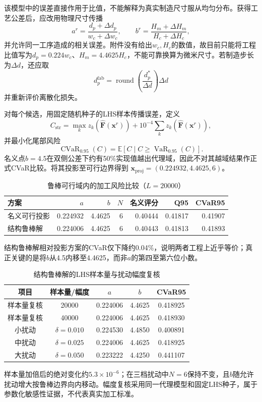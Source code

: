 \documentclass[UTF8,12pt,a4paper]{ctexart}
\newcommand{\CVaR}{\operatorname{CVaR}}
\begin{document}
该模型中的误差直接作用于比值，不能解释为真实制造尺寸服从均匀分布。获得工艺公差后，应改用物理尺寸传播
\begin{equation}
a^r=\frac{d_p+\Delta d_p}{w_c+\Delta w_c},\qquad
b^r=\frac{H_m+\Delta H_m}{H_c+\Delta H_c},
\end{equation}
并允许同一工序造成的相关误差。附件没有给出$w_c,H_c$的数值，故目前只能将工程比值写为$d_p=0.224w_c$、$H_m=4.4625H_c$，不能可靠换算为微米尺寸。若制造步长为$\Delta d$，还应取
\begin{equation}
d_p^{\mathrm{fab}}=\operatorname{round}\!\left(\frac{d_p^*}{\Delta d}\right)\Delta d
\end{equation}
并重新评价离散化损失。

对每个候选，用固定随机种子的LHS样本传播误差，定义
\begin{equation}
C_{\mathrm{str}}=\max_kz_k\!\left(\widehat{\bm F}(\bm x^r)\right)
+10^{-4}\sum_kz_k\!\left(\widehat{\bm F}(\bm x^r)\right),
\end{equation}
并最小化尾部风险
\begin{equation}
\CVaR_{0.95}(C)=\mathbb E[C\mid C\ge\operatorname{VaR}_{0.95}(C)].
\end{equation}
名义点$b=4.5$在双侧公差下约有50\%实现值越出代理域，因此不对其越域结果作正式CVaR比较。将其投影至可行边界得到
$\bm x_{\mathrm{proj}}=(0.224932,4.4625,6)$。

\begin{table}[H]\centering\small
\caption{鲁棒可行域内的加工风险比较（$L=20000$）}
\begin{tabular}{lrrrrrr}
\toprule
方案&$a$&$b$&$N$&名义评分&Q95&CVaR95\\\midrule
名义可行投影&0.224932&4.4625&6&0.40444&0.41817&0.41907\\
结构鲁棒解&0.224006&4.4625&6&0.40443&0.41813&0.41893\\
\bottomrule
\end{tabular}
\end{table}
结构鲁棒解相对投影方案的CVaR仅下降约0.04\%，说明两者工程上近乎等价；真正关键的是将$b$从4.5内移至4.4625，而非$a$的第四至第六位小数。

\begin{table}[H]\centering\small
\caption{结构鲁棒解的LHS样本量与扰动幅度复核}
\begin{tabular}{ccccc}
\toprule
项目&样本量/幅度&$a$&$b$&CVaR95\\\midrule
样本量复核&20000&0.224006&4.4625&0.418925\\
样本量复核&40000&0.224006&4.4625&0.418930\\\midrule
小扰动&$\delta=0.010$&0.224530&4.4850&0.400891\\
中扰动&$\delta=0.025$&0.224006&4.4625&0.418925\\
大扰动&$\delta=0.050$&0.223222&4.4250&0.441107\\
\bottomrule
\end{tabular}
\end{table}
样本量加倍后的绝对变化约$5.3\times10^{-6}$；在三档扰动中$N=6$保持不变，且$b$随允许扰动增大按鲁棒边界向内移动。幅度复核采用同一代理模型和固定LHS种子，属于参数化敏感性证据，不代表真实加工标准。
\end{document}
